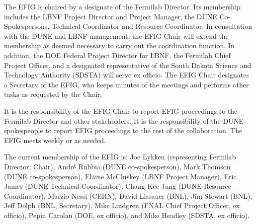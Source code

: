The EFIG is chaired by a designate of the Fermilab Director.
Its membership includes the LBNF Project Director and Project Manager,
the DUNE Co-Spokespersons, Technical Coordinator and Resource Coordinator.
In consultation with the DUNE and LBNF management, the EFIG Chair will
extend the membership as deemed necessary to carry out the coordination
function. In addition, the DOE Federal Project Director for LBNF,
the Fermilab Chief Project Officer, and a designated representative
of the South Dakota Science and Technology Authority (SDSTA) will
serve ex officio. The EFIG Chair designates a Secretary of the EFIG,
who keeps minutes of the meetings and performs other tasks as
requested by the Chair.

It is the responsibility of the EFIG Chair to report EFIG proceedings
to the Fermilab Director and other stakeholders. It is the responsibility
of the DUNE spokespeople to report EFIG proceedings to the rest of
the collaboration. The EFIG meets weekly or as needed.

The current membership of the EFIG is:
Joe Lykken (representing Fermilab Director, Chair),
André Rubbia (DUNE co-spokesperson),
Mark Thomson (DUNE co-spokesperson),
Elaine McCluskey (LBNF Project Manager),
Eric James (DUNE Technical Coordinator),
Chang Kee Jung (DUNE Resource Coordinator),
Marzio Nessi (CERN),
David Lissauer (BNL),
Jim Stewart (BNL),
Jeff Dolph (BNL, Secretary),
Mike Lindgren (FNAL Chief Project Officer, ex officio),
Pepin Carolan (DOE, ex officio), and 
Mike Headley (SDSTA, ex officio).


